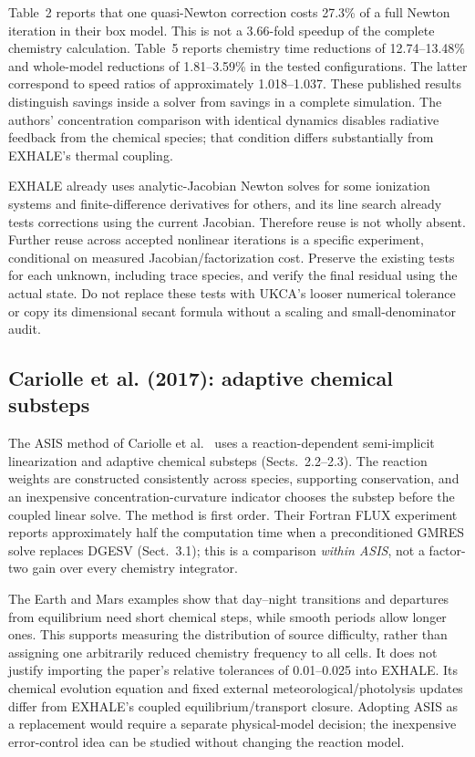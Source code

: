\documentclass[english,a4paper]{my_memo}
\begin{document}
Table~2 reports that one quasi-Newton correction costs 27.3\% of a full Newton iteration in their box model. This is not a 3.66-fold speedup of the complete chemistry calculation. Table~5 reports chemistry time reductions of 12.74--13.48\% and whole-model reductions of 1.81--3.59\% in the tested configurations. The latter correspond to speed ratios of approximately 1.018--1.037. These published results distinguish savings inside a solver from savings in a complete simulation. The authors' concentration comparison with identical dynamics disables radiative feedback from the chemical species; that condition differs substantially from EXHALE's thermal coupling.

EXHALE already uses analytic-Jacobian Newton solves for some ionization systems and finite-difference derivatives for others, and its line search already tests corrections using the current Jacobian. Therefore reuse is not wholly absent. Further reuse across accepted nonlinear iterations is a specific experiment, conditional on measured Jacobian/factorization cost. Preserve the existing tests for each unknown, including trace species, and verify the final residual using the actual state. Do not replace these tests with UKCA's looser numerical tolerance or copy its dimensional secant formula without a scaling and small-denominator audit.

\subsection{Cariolle et al. (2017): adaptive chemical substeps}
The ASIS method of Cariolle et al.\ \cite{cariolle} uses a reaction-dependent semi-implicit linearization and adaptive chemical substeps (Sects.~2.2--2.3). The reaction weights are constructed consistently across species, supporting conservation, and an inexpensive concentration-curvature indicator chooses the substep before the coupled linear solve. The method is first order. Their Fortran FLUX experiment reports approximately half the computation time when a preconditioned GMRES solve replaces DGESV (Sect.~3.1); this is a comparison \emph{within ASIS}, not a factor-two gain over every chemistry integrator.

The Earth and Mars examples show that day--night transitions and departures from equilibrium need short chemical steps, while smooth periods allow longer ones. This supports measuring the distribution of source difficulty, rather than assigning one arbitrarily reduced chemistry frequency to all cells. It does not justify importing the paper's relative tolerances of 0.01--0.025 into EXHALE. Its chemical evolution equation and fixed external meteorological/photolysis updates differ from EXHALE's coupled equilibrium/transport closure. Adopting ASIS as a replacement would require a separate physical-model decision; the inexpensive error-control idea can be studied without changing the reaction model.
\end{document}
